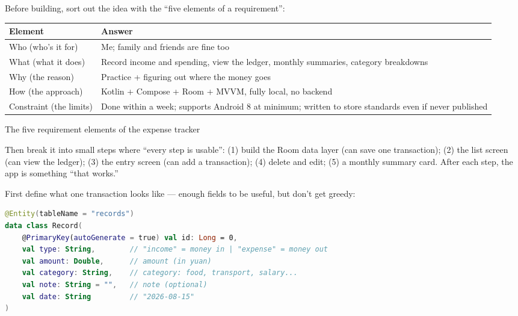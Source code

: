 


Before building, sort out the idea with the “five elements of a requirement”:

\begin{center}
\begin{tabularx}{\linewidth}{|X|X|}
\hline
\textbf{Element} & \textbf{Answer} \tabularnewline
\hline
Who (who's it for) & Me; family and friends are fine too \tabularnewline
What (what it does) & Record income and spending, view the ledger, monthly summaries, category breakdowns \tabularnewline
Why (the reason) & Practice + figuring out where the money goes \tabularnewline
How (the approach) & Kotlin + Compose + Room + MVVM, fully local, no backend \tabularnewline
Constraint (the limits) & Done within a week; supports Android 8 at minimum; written to store standards even if never published \tabularnewline
\hline
\end{tabularx}
\end{center}

\begin{center}\small\color{gray}The five requirement elements of the expense tracker\end{center}

Then break it into small steps where “every step is usable”: (1) build the Room data layer (can save one transaction); (2) the list screen (can view the ledger); (3) the entry screen (can add a transaction); (4) delete and edit; (5) a monthly summary card. After each step, the app is something “that works.”


First define what one transaction looks like — enough fields to be useful, but don't get greedy:

\begin{lstlisting}[language=Kotlin]
@Entity(tableName = "records")
data class Record(
    @PrimaryKey(autoGenerate = true) val id: Long = 0,
    val type: String,        // "income" = money in | "expense" = money out
    val amount: Double,      // amount (in yuan)
    val category: String,    // category: food, transport, salary...
    val note: String = "",   // note (optional)
    val date: String         // "2026-08-15"
)
\end{lstlisting}

